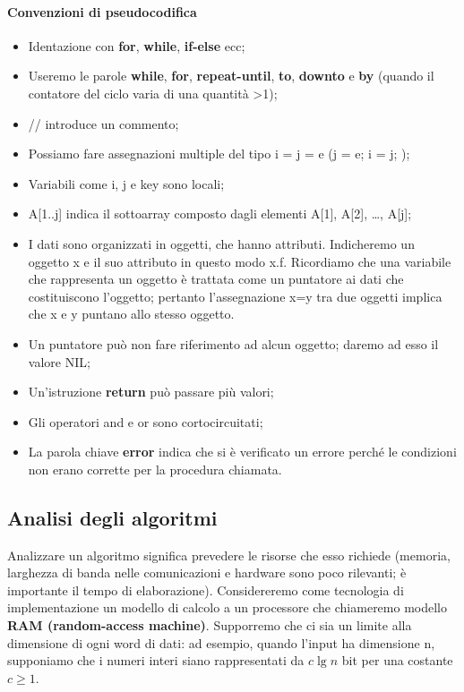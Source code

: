 \documentclass[11pt,a4paper]{article}
\begin{document}
\paragraph{Convenzioni di pseudocodifica}
\begin{itemize}[leftmargin=*]
  \item Identazione con \textbf{for}, \textbf{while}, \textbf{if-else} ecc;
  \item Useremo le parole \textbf{while}, \textbf{for}, \textbf{repeat-until}, \textbf{to}, \textbf{downto} e \textbf{by} (quando il contatore del ciclo varia di una quantità >1);
  \item // introduce un commento;
  \item Possiamo fare assegnazioni multiple del tipo i = j = e (j = e;   i = j; );
  \item Variabili come i, j e key sono locali;
  \item A[1..j] indica il sottoarray composto dagli elementi A[1], A[2], …, A[j];
  \item I dati sono organizzati in oggetti, che hanno attributi. Indicheremo un oggetto x e il suo attributo in questo modo x.f. Ricordiamo che una variabile che rappresenta un oggetto è trattata come un puntatore ai dati che costituiscono l’oggetto; pertanto l’assegnazione x=y tra due oggetti implica che x e y puntano allo stesso oggetto.
  \item Un puntatore può non fare riferimento ad alcun oggetto; daremo ad esso il valore NIL;
  \item Un’istruzione \textbf{return} può passare più valori;
  \item Gli operatori and e or sono cortocircuitati;
  \item La parola chiave \textbf{error} indica che si è verificato un errore perché le condizioni non erano corrette per la procedura chiamata.
\end{itemize}

\subsection{Analisi degli algoritmi}
Analizzare un algoritmo significa prevedere le risorse che esso richiede (memoria, larghezza di banda nelle comunicazioni e hardware sono poco rilevanti; è importante il tempo di elaborazione).
Considereremo come tecnologia di implementazione un modello di calcolo a un processore che chiameremo modello \textbf{RAM (random-access machine)}.
Supporremo che ci sia un limite alla dimensione di ogni word di dati: ad esempio, quando l’input ha dimensione n, supponiamo che i numeri interi siano rappresentati da $c \lg n$ bit per una costante $c \geq 1$.
\end{document}
